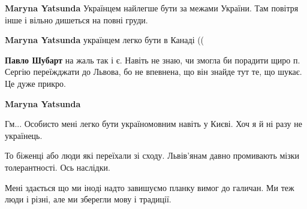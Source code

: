 \begin{itemize}
\begin{itemize}
\textbf{Maryna Yatsunda} Українцем найлегше бути за межами України. Там повітря інше і вільно дишеться на повні груди.

 
\textbf{Maryna Yatsunda} українцем легко бути в Канаді ((

 
\textbf{Павло Шубарт} на жаль так і є. Навіть не знаю, чи змогла би порадити
щиро п. Сергію переїжджати до Львова, бо не впевнена, що він знайде тут те, що
шукає. Це дуже прикро.

 
\textbf{Maryna Yatsunda} 

Гм... Особисто мені легко бути україномовним навіть у Києві. Хоч я й ні разу не
українець.

\end{itemize}

 

То біженці або люди які переїхали зі сходу. Львів'янам давно промивають мізки
толерантності. Ось наслідки.

 

Мені здається що ми іноді надто завишуємо планку вимог до галичан. Ми теж люди
і різні, але ми зберегли мову і традиції.


\end{itemize}
